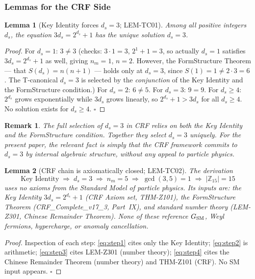 \documentclass[12pt, a4paper]{article}
\newtheorem{lemma}{Lemma}[section]
\newtheorem{remark}{Remark}[section]
\begin{document}
\subsubsection{Lemmas for the CRF Side}

\begin{lemma}[Key Identity forces $d_s = 3$; LEM-TC01]
\label{lem:unique}
Among all positive integers $d_s$, the equation
$3d_s = 2^{d_s} + 1$ has the unique solution $d_s = 3$.
\end{lemma}

\begin{proof}
For $d_s = 1$: $3 \neq 3$ (checks: $3 \cdot 1 = 3$, $2^1+1 = 3$,
so actually $d_s = 1$ satisfies $3d_s = 2^{d_s}+1$ as well, giving
$n_m = 1$, $n = 2$. However, the FormStructure Theorem — that
$S(d_s) = n(n+1)$ — holds only at $d_s = 3$, since $S(1) = 1 \neq
2 \cdot 3 = 6$. The T-canonical $d_s = 3$ is selected by the
\emph{conjunction} of the Key Identity and the FormStructure
condition.) For $d_s = 2$: $6 \neq 5$. For $d_s = 3$: $9 = 9$.
For $d_s \geq 4$: $2^{d_s}$ grows exponentially while $3d_s$ grows
linearly, so $2^{d_s} + 1 > 3d_s$ for all $d_s \geq 4$. No
solution exists for $d_s \geq 4$. \hfill$\square$
\end{proof}

\begin{remark}
The full selection of $d_s = 3$ in CRF relies on both the Key
Identity \emph{and} the FormStructure condition. Together they
select $d_s = 3$ uniquely. For the present paper, the relevant fact
is simply that the CRF framework commits to $d_s = 3$ by internal
algebraic structure, without any appeal to particle physics.
\end{remark}

\begin{lemma}[CRF chain is axiomatically closed; LEM-TC02]
\label{lem:crf-closed}
The derivation
\[
  \text{Key Identity} \;\Rightarrow\; d_s = 3 \;\Rightarrow\;
  n_m = 5 \;\Rightarrow\; \gcd(3,5)=1 \;\Rightarrow\;
  |\mathbb{Z}_{15}| = 15
\]
uses no axioms from the Standard Model of particle physics. Its
inputs are: the Key Identity $3d_s = 2^{d_s}+1$ (CRF Axiom set,
THM-Z101), the FormStructure Theorem (CRF\_Complete\_v17\_3,
Part~IX), and standard number theory (LEM-Z301, Chinese Remainder
Theorem). None of these reference $G_{\rm SM}$, Weyl fermions,
hypercharge, or anomaly cancellation.
\end{lemma}

\begin{proof}
Inspection of each step: \eqref{eq:step1} cites only the Key
Identity; \eqref{eq:step2} is arithmetic; \eqref{eq:step3} cites
LEM-Z301 (number theory); \eqref{eq:step4} cites the Chinese
Remainder Theorem (number theory) and THM-Z101 (CRF).
No SM input appears. \hfill$\square$
\end{proof}
\end{document}
